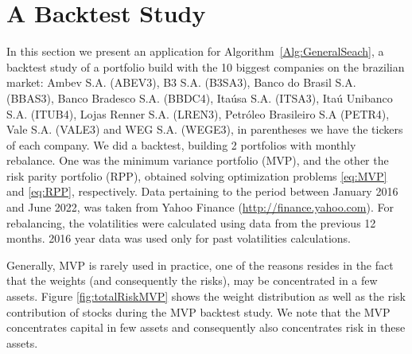 \section{A Backtest Study}

In this section we present an application for Algorithm~\ref{Alg:GeneralSeach}, a backtest study of a portfolio build with the 10 biggest companies on the brazilian market: Ambev S.A. (ABEV3), B3 S.A. (B3SA3), Banco do Brasil S.A. (BBAS3), Banco Bradesco S.A. (BBDC4), Itaúsa S.A. (ITSA3), Itaú Unibanco S.A. (ITUB4), Lojas Renner S.A. (LREN3), Petróleo Brasileiro S.A (PETR4), Vale S.A. (VALE3) and WEG S.A. (WEGE3), in parentheses we have the tickers of each company.  We did a backtest, building 2 portfolios with monthly rebalance. One was the minimum variance portfolio (MVP), and the other the risk parity portfolio (RPP),  obtained solving optimization problems \eqref{eq:MVP} and \eqref{eq:RPP}, respectively. Data pertaining to the period between January 2016  and June 2022, was taken from Yahoo Finance (\url{http://finance.yahoo.com}). For rebalancing, the volatilities were calculated using data from the previous 12 months. 2016 year data was used only for past volatilities calculations.

Generally, MVP is rarely used in practice, one of the reasons resides in the fact that the weights (and consequently the risks), may be concentrated in a few assets. Figure \ref{fig:totalRiskMVP} shows the weight distribution as well as the risk contribution of stocks during the MVP backtest study. We note that the MVP concentrates capital in few assets and consequently also concentrates risk in these assets.



